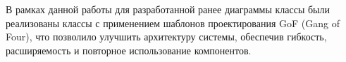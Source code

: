 В рамках данной работы для разработанной ранее диаграммы классы были реализованы
классы с применением шаблонов проектирования GoF (Gang of Four), что позволило
улучшить архитектуру системы, обеспечив гибкость, расширяемость и повторное использование
компонентов.
